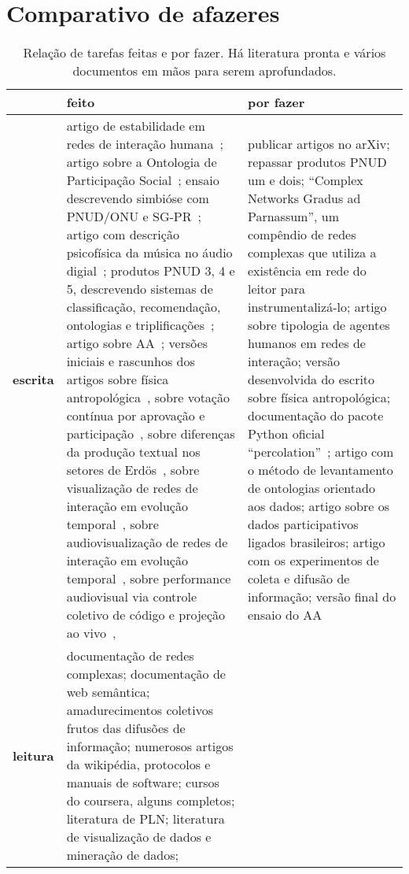 \documentclass[a4paper,openright,12pt]{report} %
\begin{document}
\section{Comparativo de afazeres}\label{sec:afa}
\begin{table}[!h]
\centering
\footnotesize
\caption{Relação de tarefas feitas e por fazer. Há literatura pronta e vários documentos em mãos para serem aprofundados.}\label{tab:afa}
\begin{tabular}{p{1.3cm}||p{7.6cm}|p{7.1cm}}\hline
	& {\bf feito} & {\bf por fazer} \\\hline
	{\bf escrita}      & artigo de estabilidade em redes de interação humana~\cite{timeS};
	artigo sobre a Ontologia de Participação Social~\cite{ops};
	ensaio descrevendo simbióse com PNUD/ONU e SG-PR~\cite{ensaioAA};
	artigo com descrição psicofísica da música no áudio digial~\cite{massa};
	produtos PNUD 3, 4 e 5, descrevendo sistemas de classificação, recomendação, ontologias e triplificações~\cite{pnud3,pnud4,pnud5};
	artigo sobre AA~\cite{paaper}; 
	versões iniciais e rascunhos dos artigos sobre física antropológica~\cite{pa},
	sobre votação contínua por aprovação e participação~\cite{vote},
	sobre diferenças da produção textual nos setores de Erdös~\cite{rcText},
	sobre visualização de redes de interação em evolução temporal~\cite{versinus},
	sobre audiovisualização de redes de interação em evolução temporal~\cite{versinus},
	sobre performance audiovisual via controle coletivo de código e projeção ao vivo~\cite{vivace},
	& publicar artigos no arXiv; repassar produtos PNUD um e dois;
	``Complex Networks Gradus ad Parnassum'', um compêndio de redes complexas que utiliza a existência
	em rede do leitor para instrumentalizá-lo;
	artigo sobre tipologia de agentes humanos em redes de interação;
	versão desenvolvida do escrito sobre física antropológica;
	documentação do pacote Python oficial ``percolation''~\cite{percolation};
	artigo com o método de levantamento de ontologias orientado aos dados;
	artigo sobre os dados participativos ligados brasileiros;
	artigo com os experimentos de coleta e difusão de informação;
	versão final do ensaio do AA~\cite{ensaaio}\\\hline
	{\bf leitura }     & documentação de redes complexas;
			documentação de web semântica;
			amadurecimentos coletivos frutos das difusões de informação;
	               numerosos artigos da wikipédia, protocolos e manuais de software;
		       cursos do coursera, alguns completos;
		       literatura de PLN;
		       literatura de visualização de dados e mineração de dados;

\end{tabular}
\end{table}
\end{document}
